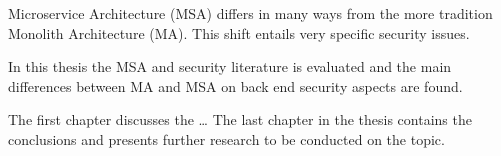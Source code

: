 \begin{sloppypar}
    Microservice Architecture (MSA) differs in many ways from 
    the more tradition Monolith Architecture (MA). This shift entails very 
    specific security issues.
\end{sloppypar}
\begin{sloppypar}
    In this thesis the MSA and security literature is evaluated and the main 
    differences between MA and MSA on back end security aspects are found.
\end{sloppypar}
\begin{sloppypar}
    The first chapter discusses the \dots
    The last chapter in the thesis contains the conclusions and presents further 
    research to be conducted on the topic.
\end{sloppypar}





